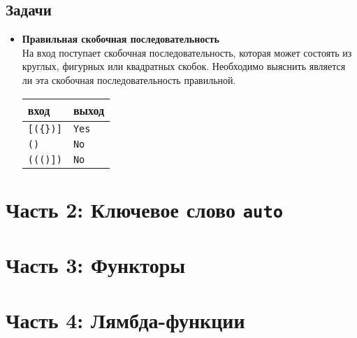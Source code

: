 \documentclass{article}
\begin{document}
\subsection*{Задачи}
\begin{itemize}
\item \textbf{Правильная скобочная последовательность} \\
На вход поступает скобочная последовательность, которая может состоять из круглых, фигурных или квадратных скобок. Необходимо выяснить является ли эта скобочная последовательность правильной.
\begin{center}
\begin{tabular}{ l | l }
 вход & выход \\ \hline
 \texttt{[(\{\})]} & \texttt{Yes}  \\ 
 \texttt{({)}} & \texttt{No}  \\ 
 \texttt{((()])} & \texttt{No} \\
\end{tabular}
\end{center}
\end{itemize}

\newpage
\section*{Часть 2: Ключевое слово \texttt{auto}}
\newpage
\section*{Часть 3: Функторы}
\newpage
\section*{Часть 4: Лямбда-функции}
\end{document}
